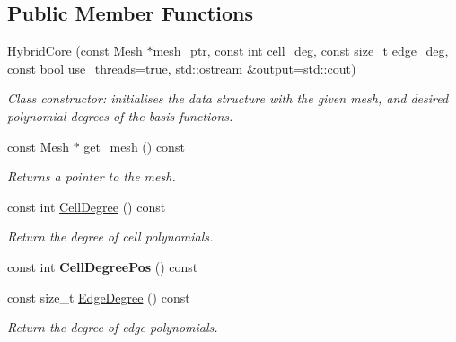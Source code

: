 \subsection*{Public Member Functions}
\begin{DoxyCompactItemize}
\item 
\hyperlink{classHArDCore2D_1_1HybridCore_ac6d3499861364085cc61cdde5c2c1241}{Hybrid\+Core} (const \hyperlink{classHArDCore2D_1_1Mesh}{Mesh} $\ast$mesh\+\_\+ptr, const int cell\+\_\+deg, const size\+\_\+t edge\+\_\+deg, const bool use\+\_\+threads=true, std\+::ostream \&output=std\+::cout)
\begin{DoxyCompactList}\small\item\em Class constructor\+: initialises the data structure with the given mesh, and desired polynomial degrees of the basis functions. \end{DoxyCompactList}\item 
\mbox{\label{classHArDCore2D_1_1HybridCore_a8e87aec0e4162f6307eef0c04216a6cd}} 
const \hyperlink{classHArDCore2D_1_1Mesh}{Mesh} $\ast$ \hyperlink{classHArDCore2D_1_1HybridCore_a8e87aec0e4162f6307eef0c04216a6cd}{get\+\_\+mesh} () const
\begin{DoxyCompactList}\small\item\em Returns a pointer to the mesh. \end{DoxyCompactList}\item 
\mbox{\label{classHArDCore2D_1_1HybridCore_a39e2fbe7da3ab2425544b31fab6963f1}} 
const int \hyperlink{classHArDCore2D_1_1HybridCore_a39e2fbe7da3ab2425544b31fab6963f1}{Cell\+Degree} () const
\begin{DoxyCompactList}\small\item\em Return the degree of cell polynomials. \end{DoxyCompactList}\item 
\mbox{\label{classHArDCore2D_1_1HybridCore_a2840c8c1113b389fbee0cbf3090cee1c}} 
const int {\bfseries Cell\+Degree\+Pos} () const
\item 
\mbox{\label{classHArDCore2D_1_1HybridCore_a58775081d94627e58f88f6043ed87bec}} 
const size\+\_\+t \hyperlink{classHArDCore2D_1_1HybridCore_a58775081d94627e58f88f6043ed87bec}{Edge\+Degree} () const
\begin{DoxyCompactList}\small\item\em Return the degree of edge polynomials. \end{DoxyCompactList}\item 

\end{DoxyCompactItemize}
